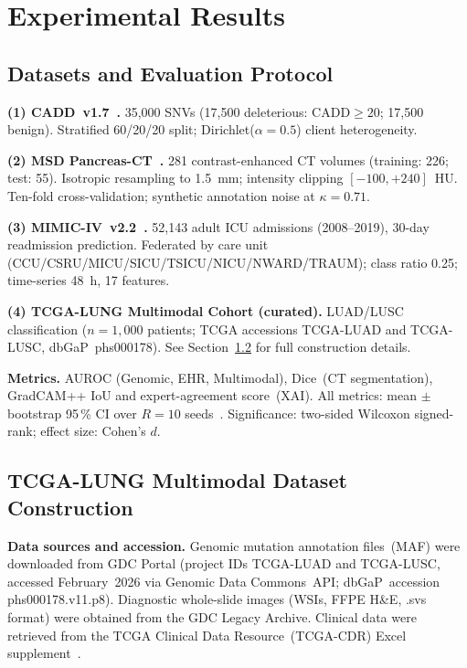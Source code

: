 \documentclass[journal,draftclsnofoot,10pt,onecolumn]{IEEEtran}
\begin{document}
\section{Experimental Results}
\label{sec:results}

\subsection{Datasets and Evaluation Protocol}

\textbf{(1) CADD~v1.7~\cite{rentzsch2019cadd}.}
35,000 SNVs (17,500 deleterious: CADD$\!\geq\!20$; 17,500 benign).
Stratified 60/20/20 split; Dirichlet($\alpha\!=\!0.5$) client heterogeneity.

\textbf{(2) MSD Pancreas-CT~\cite{simpson2019msd}.}
281 contrast-enhanced CT volumes (training: 226; test: 55).
Isotropic resampling to 1.5~mm; intensity clipping $[-100,+240]$~HU.
Ten-fold cross-validation; synthetic annotation noise at $\kappa\!=\!0.71$.

\textbf{(3) MIMIC-IV~v2.2~\cite{johnson2023mimiciv}.}
52,143 adult ICU admissions (2008--2019), 30-day readmission prediction.
Federated by care unit (CCU/CSRU/MICU/SICU/TSICU/NICU/NWARD/TRAUM);
class ratio 0.25; time-series 48~h, 17 features.

\textbf{(4) TCGA-LUNG Multimodal Cohort (curated).}
LUAD/LUSC classification ($n\!=\!1{,}000$ patients; TCGA accessions
TCGA-LUAD and TCGA-LUSC, dbGaP~phs000178).
See Section~\ref{subsec:tcga} for full construction details.

\textbf{Metrics.} AUROC (Genomic, EHR, Multimodal), Dice~(CT segmentation),
GradCAM++ IoU and expert-agreement score~(XAI). All metrics: mean $\pm$ bootstrap
95\,\% CI over $R\!=\!10$ seeds~\cite{efron1993bootstrap}. Significance:
two-sided Wilcoxon signed-rank; effect size: Cohen's $d$.

\subsection{TCGA-LUNG Multimodal Dataset Construction}
\label{subsec:tcga}

\textbf{Data sources and accession.}
Genomic mutation annotation files~(MAF) were downloaded from GDC Portal
(project IDs TCGA-LUAD and TCGA-LUSC, accessed February~2026 via Genomic Data
Commons~API; dbGaP~accession phs000178.v11.p8). Diagnostic whole-slide images
(WSIs, FFPE H\&E, .svs format) were obtained from the GDC Legacy Archive.
Clinical data were retrieved from the TCGA Clinical Data Resource~(TCGA-CDR)
Excel supplement~\cite{liu2018tcgacdr}.
\end{document}
